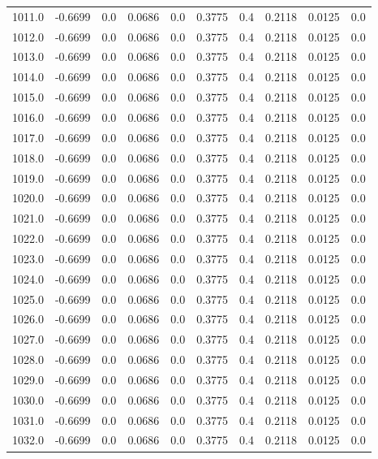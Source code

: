 \begin{longtable}{lrrrrrrrrr}
1011.0 & -0.6699 & 0.0 & 0.0686 & 0.0 & 0.3775 & 0.4 & 0.2118 & 0.0125 & 0.0 \\
1012.0 & -0.6699 & 0.0 & 0.0686 & 0.0 & 0.3775 & 0.4 & 0.2118 & 0.0125 & 0.0 \\
1013.0 & -0.6699 & 0.0 & 0.0686 & 0.0 & 0.3775 & 0.4 & 0.2118 & 0.0125 & 0.0 \\
1014.0 & -0.6699 & 0.0 & 0.0686 & 0.0 & 0.3775 & 0.4 & 0.2118 & 0.0125 & 0.0 \\
1015.0 & -0.6699 & 0.0 & 0.0686 & 0.0 & 0.3775 & 0.4 & 0.2118 & 0.0125 & 0.0 \\
1016.0 & -0.6699 & 0.0 & 0.0686 & 0.0 & 0.3775 & 0.4 & 0.2118 & 0.0125 & 0.0 \\
1017.0 & -0.6699 & 0.0 & 0.0686 & 0.0 & 0.3775 & 0.4 & 0.2118 & 0.0125 & 0.0 \\
1018.0 & -0.6699 & 0.0 & 0.0686 & 0.0 & 0.3775 & 0.4 & 0.2118 & 0.0125 & 0.0 \\
1019.0 & -0.6699 & 0.0 & 0.0686 & 0.0 & 0.3775 & 0.4 & 0.2118 & 0.0125 & 0.0 \\
1020.0 & -0.6699 & 0.0 & 0.0686 & 0.0 & 0.3775 & 0.4 & 0.2118 & 0.0125 & 0.0 \\
1021.0 & -0.6699 & 0.0 & 0.0686 & 0.0 & 0.3775 & 0.4 & 0.2118 & 0.0125 & 0.0 \\
1022.0 & -0.6699 & 0.0 & 0.0686 & 0.0 & 0.3775 & 0.4 & 0.2118 & 0.0125 & 0.0 \\
1023.0 & -0.6699 & 0.0 & 0.0686 & 0.0 & 0.3775 & 0.4 & 0.2118 & 0.0125 & 0.0 \\
1024.0 & -0.6699 & 0.0 & 0.0686 & 0.0 & 0.3775 & 0.4 & 0.2118 & 0.0125 & 0.0 \\
1025.0 & -0.6699 & 0.0 & 0.0686 & 0.0 & 0.3775 & 0.4 & 0.2118 & 0.0125 & 0.0 \\
1026.0 & -0.6699 & 0.0 & 0.0686 & 0.0 & 0.3775 & 0.4 & 0.2118 & 0.0125 & 0.0 \\
1027.0 & -0.6699 & 0.0 & 0.0686 & 0.0 & 0.3775 & 0.4 & 0.2118 & 0.0125 & 0.0 \\
1028.0 & -0.6699 & 0.0 & 0.0686 & 0.0 & 0.3775 & 0.4 & 0.2118 & 0.0125 & 0.0 \\
1029.0 & -0.6699 & 0.0 & 0.0686 & 0.0 & 0.3775 & 0.4 & 0.2118 & 0.0125 & 0.0 \\
1030.0 & -0.6699 & 0.0 & 0.0686 & 0.0 & 0.3775 & 0.4 & 0.2118 & 0.0125 & 0.0 \\
1031.0 & -0.6699 & 0.0 & 0.0686 & 0.0 & 0.3775 & 0.4 & 0.2118 & 0.0125 & 0.0 \\
1032.0 & -0.6699 & 0.0 & 0.0686 & 0.0 & 0.3775 & 0.4 & 0.2118 & 0.0125 & 0.0 \\

\end{longtable}
